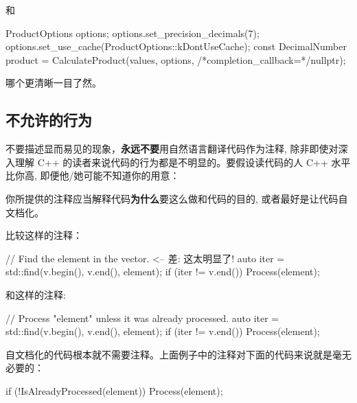 和

\begin{cppcode}
ProductOptions options;
options.set_precision_decimals(7);
options.set_use_cache(ProductOptions::kDontUseCache);
const DecimalNumber product =
CalculateProduct(values, options, /*completion_callback=*/nullptr);
\end{cppcode}

哪个更清晰一目了然。

\subsection{不允许的行为}

不要描述显而易见的现象，\textbf{永远不要}用自然语言翻译代码作为注释, 除非即使对深入理解 C++ 的读者来说代码的行为都是不明显的。要假设读代码的人 C++ 水平比你高, 即便他/她可能不知道你的用意：

你所提供的注释应当解释代码\textbf{为什么}要这么做和代码的目的, 或者最好是让代码自文档化。

比较这样的注释：

\begin{cppcode}
  // Find the element in the vector.  <-- 差: 这太明显了!
  auto iter = std::find(v.begin(), v.end(), element);
  if (iter != v.end()) {
      Process(element);
    }
\end{cppcode}

和这样的注释:

\begin{cppcode}
  // Process "element" unless it was already processed.
  auto iter = std::find(v.begin(), v.end(), element);
  if (iter != v.end()) {
      Process(element);
    }
\end{cppcode}

自文档化的代码根本就不需要注释。上面例子中的注释对下面的代码来说就是毫无必要的：


\begin{cppcode}
  if (!IsAlreadyProcessed(element)) {
      Process(element);
    }
\end{cppcode}

